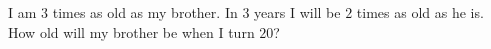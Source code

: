 I am \(3\) times as old as my brother. In \(3\) years I will be \(2\) times as old as he is. How old will my brother be when I turn \(20\)?
